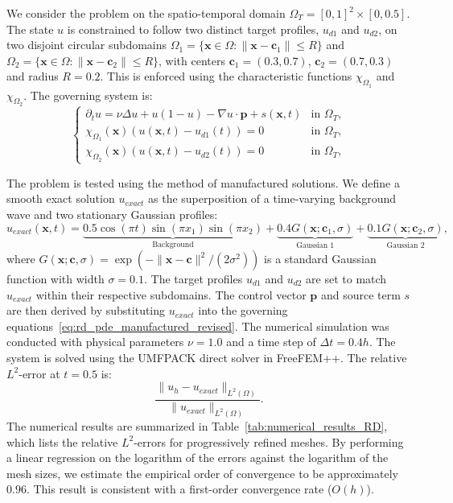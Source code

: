 \documentclass[pdflatex,sn-mathphys-num]{sn-jnl}%
\theoremstyle{thmstyleone}%
\numberwithin{equation}{section}
\begin{document}
We consider the problem on the spatio-temporal domain $\Omega_T = [0,1]^2 \times [0, 0.5]$. The state $u$ is constrained to follow two distinct target profiles, $u_{d1}$ and $u_{d2}$, on two disjoint circular subdomains $\Omega_1 = \{ \bm{x} \in \Omega : \| \bm{x} - \bm{c}_1 \| \leq R \}$ and $\Omega_2 = \{ \bm{x} \in \Omega : \| \bm{x} - \bm{c}_2 \| \leq R \}$, with centers $\bm{c}_1=(0.3, 0.7)$, $\bm{c}_2=(0.7, 0.3)$ and radius $R=0.2$. This is enforced using the characteristic functions $\chi_{\Omega_1}$ and $\chi_{\Omega_2}$. The governing system is:
\begin{equation}
\label{eq:rd_pde_manufactured_revised}
\begin{cases}
\partial_t u = \nu \Delta u + u(1 - u) - \nabla u \cdot \bm{p} + s(\bm{x}, t) & \text{in } \Omega_T, \\
\chi_{\Omega_1}(\bm{x}) (u(\bm{x}, t) - u_{d1}(t)) = 0 & \text{in } \Omega_T, \\
\chi_{\Omega_2}(\bm{x}) (u(\bm{x}, t) - u_{d2}(t)) = 0 & \text{in } \Omega_T,
\end{cases}
\end{equation}

The problem is tested using the method of manufactured solutions. We define a smooth exact solution $u_{exact}$ as the superposition of a time-varying background wave and two stationary Gaussian profiles:
\begin{equation*}
u_{exact}(\bm{x}, t) = \underbrace{0.5 \cos(\pi t) \sin(\pi x_1) \sin(\pi x_2)}_{\text{Background}} + \underbrace{0.4 G(\bm{x}; \bm{c}_1, \sigma)}_{\text{Gaussian 1}} + \underbrace{0.1 G(\bm{x}; \bm{c}_2, \sigma)}_{\text{Gaussian 2}},
\end{equation*}
where $G(\bm{x}; \bm{c}, \sigma) = \exp(-\|\bm{x}-\bm{c}\|^2 / (2\sigma^2))$ is a standard Gaussian function with width $\sigma=0.1$. The target profiles $u_{d1}$ and $u_{d2}$ are set to match $u_{exact}$ within their respective subdomains. The control vector $\bm{p}$ and source term $s$ are then derived by substituting $u_{exact}$ into the governing equations~\eqref{eq:rd_pde_manufactured_revised}. The numerical simulation was conducted with physical parameters $\nu=1.0$ and a time step of $\Delta t = 0.4h$. The system is solved using the UMFPACK direct solver in FreeFEM++. The relative $L^2$-error at $t = 0.5$ is:
\[
\frac{\| u_h - u_{exact} \|_{L^2(\Omega)}}{\| u_{exact} \|_{L^2(\Omega)}}.
\]
The numerical results are summarized in Table~\ref{tab:numerical_results_RD}, which lists the relative $L^2$-errors for progressively refined meshes. By performing a linear regression on the logarithm of the errors against the logarithm of the mesh sizes, we estimate the empirical order of convergence to be approximately $0.96$. This result is consistent with a first-order convergence rate ($O(h)$).
\end{document}
